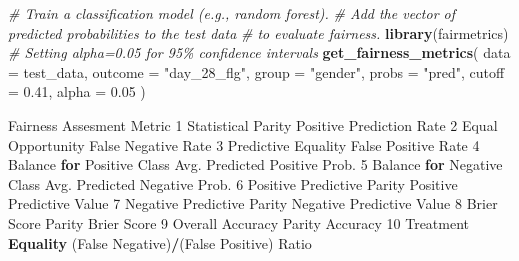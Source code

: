 \documentclass[10pt,a4paper,onecolumn]{article}
\newenvironment{Shaded}{\begin{snugshade}}{\end{snugshade}}
\newcommand{\AttributeTok}[1]{\textcolor[rgb]{0.13,0.29,0.53}{#1}}
\newcommand{\CommentTok}[1]{\textcolor[rgb]{0.56,0.35,0.01}{\textit{#1}}}
\newcommand{\ControlFlowTok}[1]{\textcolor[rgb]{0.13,0.29,0.53}{\textbf{#1}}}
\newcommand{\DecValTok}[1]{\textcolor[rgb]{0.00,0.00,0.81}{#1}}
\newcommand{\FloatTok}[1]{\textcolor[rgb]{0.00,0.00,0.81}{#1}}
\newcommand{\FunctionTok}[1]{\textcolor[rgb]{0.13,0.29,0.53}{\textbf{#1}}}
\newcommand{\NormalTok}[1]{#1}
\newcommand{\SpecialCharTok}[1]{\textcolor[rgb]{0.81,0.36,0.00}{\textbf{#1}}}
\newcommand{\StringTok}[1]{\textcolor[rgb]{0.31,0.60,0.02}{#1}}
\begin{document}
\begin{Shaded}
\begin{Highlighting}[]
\CommentTok{\# Train a classification model (e.g., random forest).}
\CommentTok{\# Add the vector of predicted probabilities to the test data}
\CommentTok{\# to evaluate fairness.}
\FunctionTok{library}\NormalTok{(fairmetrics)}
\CommentTok{\# Setting alpha=0.05 for 95\% confidence intervals}
\FunctionTok{get\_fairness\_metrics}\NormalTok{(}
 \AttributeTok{data =}\NormalTok{ test\_data,}
 \AttributeTok{outcome =} \StringTok{"day\_28\_flg"}\NormalTok{,}
 \AttributeTok{group =} \StringTok{"gender"}\NormalTok{,}
 \AttributeTok{probs =} \StringTok{"pred"}\NormalTok{,}
 \AttributeTok{cutoff =} \FloatTok{0.41}\NormalTok{, }
 \AttributeTok{alpha =} \FloatTok{0.05}
\NormalTok{)}

\NormalTok{           Fairness Assesment                                  Metric}
\DecValTok{1}\NormalTok{          Statistical Parity                Positive Prediction Rate}
\DecValTok{2}\NormalTok{           Equal Opportunity                     False Negative Rate}
\DecValTok{3}\NormalTok{         Predictive Equality                     False Positive Rate}
\DecValTok{4}\NormalTok{  Balance }\ControlFlowTok{for}\NormalTok{ Positive Class           Avg. Predicted Positive Prob.}
\DecValTok{5}\NormalTok{  Balance }\ControlFlowTok{for}\NormalTok{ Negative Class           Avg. Predicted Negative Prob.}
\DecValTok{6}\NormalTok{  Positive Predictive Parity               Positive Predictive Value}
\DecValTok{7}\NormalTok{  Negative Predictive Parity               Negative Predictive Value}
\DecValTok{8}\NormalTok{          Brier Score Parity                             Brier Score}
\DecValTok{9}\NormalTok{     Overall Accuracy Parity                                Accuracy}
\DecValTok{10}\NormalTok{         Treatment }\FunctionTok{Equality}\NormalTok{ (False Negative)}\SpecialCharTok{/}\NormalTok{(False Positive) Ratio}


\end{Highlighting}
\end{Shaded}
\end{document}
